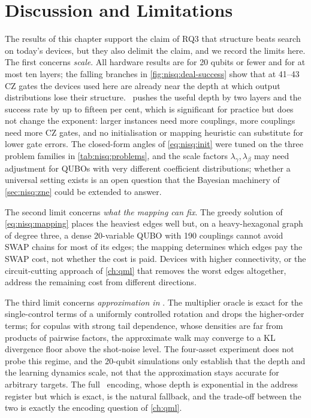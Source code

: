 \section{Discussion and Limitations}\label{sec:nisq:discussion}

The results of this chapter support the claim of RQ3 that structure beats search on today's devices, but they also delimit the claim, and we record the limits here. The first concerns \emph{scale}. All hardware results are for 20 qubits or fewer and for at most ten layers; the falling branches in \cref{fig:nisq:deal-success} show that at 41--43 CZ gates the devices used here are already near the depth at which output distributions lose their structure. \deal\ pushes the useful depth by two layers and the success rate by up to fifteen per cent, which is significant for practice but does not change the exponent: larger instances need more couplings, more couplings need more CZ gates, and no initialisation or mapping heuristic can substitute for lower gate errors. The closed-form angles of \cref{eq:nisq:init} were tuned on the three problem families in \cref{tab:nisq:problems}, and the scale factors $\lambda_{\gamma},\lambda_{\beta}$ may need adjustment for QUBOs with very different coefficient distributions; whether a universal setting exists is an open question that the Bayesian machinery of \cref{sec:nisq:zne} could be extended to answer.

The second limit concerns \emph{what the mapping can fix}. The greedy solution of \cref{eq:nisq:mapping} places the heaviest edges well but, on a heavy-hexagonal graph of degree three, a dense 20-variable QUBO with 190 couplings cannot avoid SWAP chains for most of its edges; the mapping determines which edges pay the SWAP cost, not whether the cost is paid. Devices with higher connectivity, or the circuit-cutting approach of \cref{ch:qml} that removes the worst edges altogether, address the remaining cost from different directions.

The third limit concerns \emph{approximation in \qawa}. The multiplier oracle is exact for the single-control terms of a uniformly controlled rotation and drops the higher-order terms; for copulas with strong tail dependence, whose densities are far from products of pairwise factors, the approximate walk may converge to a KL divergence floor above the shot-noise level. The four-asset experiment does not probe this regime, and the 20-qubit simulations only establish that the depth and the learning dynamics scale, not that the approximation stays accurate for arbitrary targets. The full \qcrank\ encoding, whose depth is exponential in the address register but which is exact, is the natural fallback, and the trade-off between the two is exactly the encoding question of \cref{ch:qml}.

